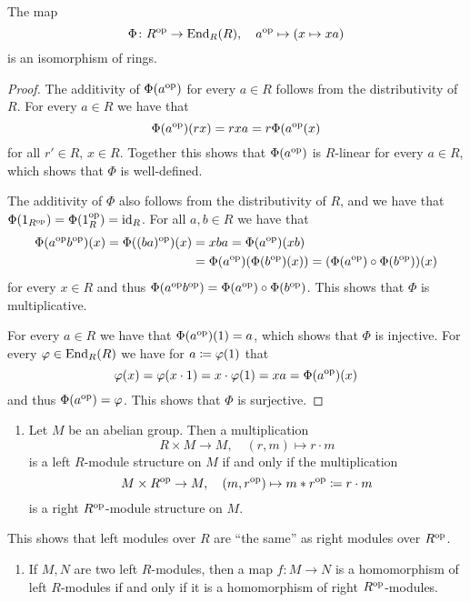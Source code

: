 \begin{lemma}
  \label{lemma: End_R(R) = Rop}
  The map
  \[
              \Phi
    \colon    R^{\operatorname{op}}
    \to       \operatorname{End}_R(R),
    \quad     a^{\operatorname{op}}
    \mapsto   (x \mapsto xa)
  \]
  is an isomorphism of rings.
\end{lemma}


\begin{proof}
  The additivity of $\Phi(a^{\operatorname{op}})$ for every $a \in R$ follows from the distributivity of $R$.
  For every $a \in R$ we have that
  \[
      \Phi(a^{\operatorname{op}})(rx)
    = r x a
    = r \Phi(a^{\operatorname{op}}(x)
  \]
  for all $r' \in R$, $x \in R$.
  Together this shows that $\Phi(a^{\operatorname{op}})$ is $R$-linear for every $a \in R$, which shows that $\Phi$ is well-defined.
  
  The additivity of $\Phi$ also follows from the distributivity of $R$, and we have that $\Phi(1_{R^{\operatorname{op}}}) = \Phi(1_R^{\operatorname{op}}) = \operatorname{id}_R$.
  For all $a, b \in R$ we have that
  \begin{align*}
        \Phi(a^{\operatorname{op}} b^{\operatorname{op}})(x)
     =  \Phi((ba)^{\operatorname{op}})(x)
    &=  x b a
     =  \Phi(a^{\operatorname{op}})(x b)  \\
    &=  \Phi(a^{\operatorname{op}})(\Phi(b^{\operatorname{op}})(x))
     =  (\Phi(a^{\operatorname{op}}) \circ \Phi(b^{\operatorname{op}}))(x)
  \end{align*}
  for every $x \in R$ and thus $\Phi(a^{\operatorname{op}} b^{\operatorname{op}}) = \Phi(a^{\operatorname{op}}) \circ \Phi(b^{\operatorname{op}})$.
  This shows that $\Phi$ is multiplicative.
  
  For every $a \in R$ we have that $\Phi(a^{\operatorname{op}})(1) = a$, which shows that $\Phi$ is injective.
  For every $\varphi \in \operatorname{End}_R(R)$ we have for $a \coloneqq \varphi(1)$ that
  \[
      \varphi(x)
    = \varphi(x \cdot 1)
    = x \cdot \varphi(1)
    = x a
    = \Phi(a^{\operatorname{op}})(x)
  \]
  and thus $\Phi(a^{\operatorname{op}}) = \varphi$.
  This shows that $\Phi$ is surjective.
\end{proof}


\begin{proposition}
  \label{proposition: left right modules under op}
  \leavevmode
  \begin{enumerate}
    \item
      Let $M$ be an abelian group.
      Then a multiplication
      \[
                R \times M 
        \to     M,
        \quad   (r,m)
        \mapsto r \cdot m
      \]
      is a left $R$-module structure on $M$ if and only if the multiplication
      \[
                  M \times R^{\operatorname{op}}
        \to       M,
        \quad     (m, r^{\operatorname{op}})
        \mapsto   m * r^{\operatorname{op}}
        \coloneqq  r \cdot m
      \]
      is a right $R^{\operatorname{op}}$-module structure on $M$.
  \end{enumerate}
  This shows that left modules over $R$ are \enquote{the same} as right modules over $R^{\operatorname{op}}$.
  \begin{enumerate}[resume]
    \item
      If $M, N$ are two left $R$-modules, then a map $f \colon M \to N$ is a homomorphism of left $R$-modules if and only if it is a homomorphism of right $R^{\operatorname{op}}$-modules.
  \end{enumerate}
\end{proposition}



